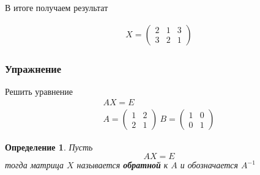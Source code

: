 \documentclass[]{article}
\newtheorem{dfn}{Определение}
\begin{document}
В итоге получаем результат

\begin{gather*}
X=
\left(
\begin{matrix}
	2 & 1 & 3
	\\
	3 & 2 & 1
\end{matrix}\right)
\end{gather*}
\subsubsection{Упражнение}
Решить уравнение
\begin{gather*}
	AX=E
	\\
	A=
	\begin{pmatrix}
		1 & 2
		\\
		2 & 1
	\end{pmatrix}
	\
	B=
	\begin{pmatrix}
		1 & 0
		\\
		0 & 1
	\end{pmatrix}
\end{gather*}
\begin{dfn}
	Пусть
	\begin{equation}
		AX=E
	\end{equation}
	тогда матрица $X$ называется \textbf{обратной} к $A$ и обозначается $A^{-1}$
\end{dfn}
\end{document}
